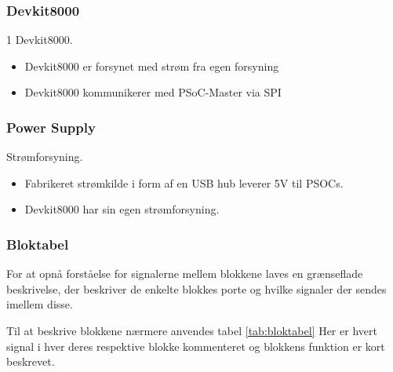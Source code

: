 \subsubsection{Devkit8000}
1 Devkit8000.
\begin{itemize}
    \item Devkit8000 er forsynet med strøm fra egen forsyning
    \item Devkit8000 kommunikerer med PSoC-Master via SPI
\end{itemize}

\subsubsection{Power Supply}
Strømforsyning.
\begin{itemize}
    \item Fabrikeret strømkilde i form af en USB hub leverer 5V til PSOCs. 
    \item Devkit8000 har sin egen strømforsyning.
\end{itemize}


\subsubsection{Bloktabel}
For at opnå forståelse for signalerne mellem blokkene laves en grænseflade beskrivelse, der beskriver de enkelte blokkes porte og hvilke signaler der sendes imellem disse. 

Til at beskrive blokkene nærmere anvendes tabel \ref{tab:bloktabel} Her er hvert signal i hver deres respektive blokke kommenteret og blokkens funktion er kort beskrevet. 

